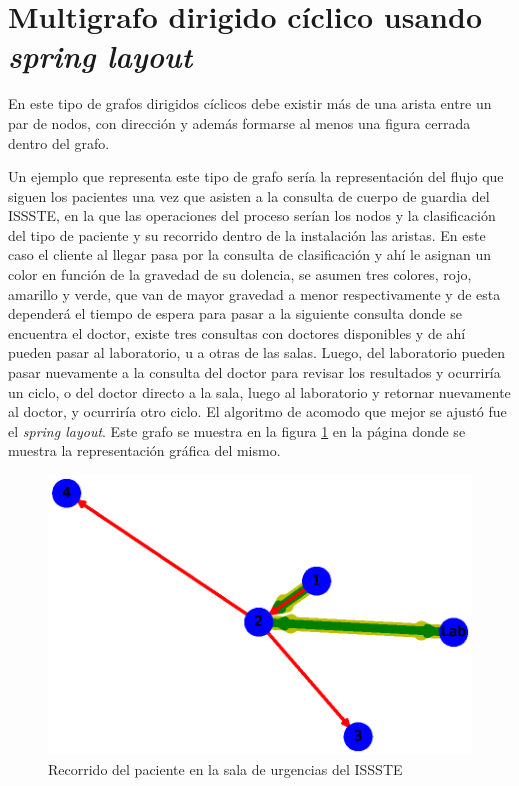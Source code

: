 \documentclass{article}
\begin{document}
\section{Multigrafo dirigido cíclico usando \textit{spring layout}}

En este tipo de grafos dirigidos cíclicos debe existir más de una arista entre un par de nodos, con dirección y además formarse al menos una figura cerrada dentro del grafo. 

Un ejemplo que representa este tipo de grafo sería la representación del flujo que siguen los pacientes una vez que asisten a la consulta de cuerpo de guardia del ISSSTE, en la que las operaciones del proceso serían los nodos y la clasificación del tipo de paciente y su recorrido dentro de la instalación las aristas. En este caso el cliente al llegar pasa por la consulta de clasificación y ahí le asignan un color en función de la gravedad de su dolencia, se asumen tres colores, rojo, amarillo y verde, que van de mayor gravedad a menor respectivamente y de esta dependerá el tiempo de espera para pasar a la siguiente consulta donde se encuentra el doctor, existe tres consultas con doctores disponibles y de ahí pueden pasar al laboratorio, u a otras de las salas. Luego, del laboratorio pueden pasar nuevamente a la consulta del doctor para revisar los resultados y ocurriría un ciclo, o del doctor directo a la sala, luego al laboratorio y retornar nuevamente al doctor, y ocurriría otro ciclo. El algoritmo de acomodo que mejor se ajustó fue el \textit{spring layout}. Este grafo se muestra en la figura \ref{fig:Fig11} en la página \pageref{fig:Fig11} donde se muestra la representación gráfica del mismo. 
\newpage


\begin{figure}[h]
    \centering
    \includegraphics[scale=0.6]{imagenes1/Fig11.eps}
    \caption{Recorrido del paciente en la sala de urgencias del ISSSTE}
    \label{fig:Fig11}
\end{figure}
\end{document}
